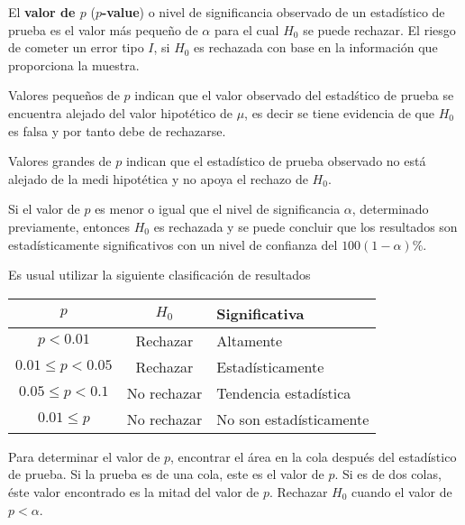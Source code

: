 \begin{Def}
El \textbf{valor de $p$} (\textbf{$p$-value}) o nivel de significancia observado de un estad\'istico de prueba es el valor m\'as peque\~ no de $\alpha$ para el cual $H_{0}$ se puede rechazar. El riesgo de cometer un error tipo $I$, si $H_{0}$ es rechazada con base en la informaci\'on que proporciona la muestra.
\end{Def}

\begin{Note}
Valores peque\~ nos de $p$ indican 	que el valor observado del estad\'stico de prueba se encuentra alejado del valor hipot\'etico de $\mu$, es decir se tiene evidencia de que $H_{0}$ es falsa y por tanto debe de rechazarse.
\end{Note}

\begin{Note}
Valores grandes de $p$ indican que el estad\'istico de prueba observado no est\'a alejado de la medi hipot\'etica y no apoya el rechazo de $H_{0}$.
\end{Note}

\begin{Def}
Si el valor de $p$ es menor o igual que el nivel de significancia $\alpha$, determinado previamente, entonces $H_{0}$ es rechazada y se puede concluir que los resultados son estad\'isticamente significativos con un nivel de confianza del $100\left(1-\alpha\right)\%$.
\end{Def}
Es usual utilizar la siguiente clasificaci\'on de resultados

\begin{tabular}{|c||c|l|}\hline
$p$& $H_{0}$&Significativa\\\hline\hline
$p<0.01$&Rechazar &Altamente\\\hline
$0.01\leq p<0.05$ & Rechazar&Estad\'isticamente\\\hline
$0.05\leq p <0.1$ & No rechazar & Tendencia estad\'istica\\\hline
$0.01\leq p$ & No rechazar & No son estad\'isticamente\\\hline
\end{tabular}

\begin{Note}
Para determinar el valor de $p$, encontrar el \'area en la cola despu\'es del estad\'istico de prueba. Si la prueba es de una cola, este es el valor de $p$. Si es de dos colas, \'este valor encontrado es la mitad del valor de $p$. Rechazar $H_{0}$ cuando el valor de $p<\alpha$.
\end{Note}


